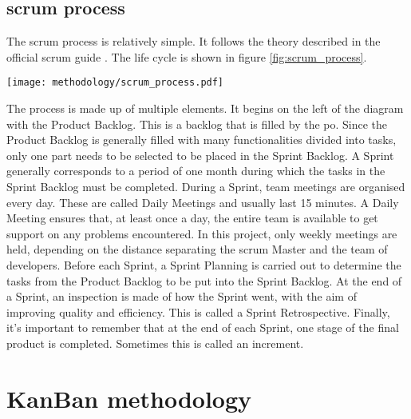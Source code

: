 \subsection{\texorpdfstring{\gls{scrum}}{} process}
The \gls{scrum} process is relatively simple. It follows the theory described in the official \gls{scrum} guide \cite{scrum_guide}. The life cycle is shown in figure \ref{fig:scrum_process}.
\begin{center}
    \begingroup
    \texttt{[image: methodology/scrum\_process.pdf]}
    \label{fig:scrum_process}
    \endgroup
\end{center}
The process is made up of multiple elements. It begins on the left of the diagram with the Product Backlog. This is a backlog that is filled by the \acrshort{po}. Since the Product Backlog is generally filled with many functionalities divided into tasks, only one part needs to be selected to be placed in the Sprint Backlog. A Sprint generally corresponds to a period of one month during which the tasks in the Sprint Backlog must be completed. During a Sprint, team meetings are organised every day. These are called Daily Meetings and usually last 15 minutes. A Daily Meeting ensures that, at least once a day, the entire team is available to get support on any problems encountered. In this project, only weekly meetings are held, depending on the distance separating the \gls{scrum} Master and the team of developers. Before each Sprint, a Sprint Planning is carried out to determine the tasks from the Product Backlog to be put into the Sprint Backlog. At the end of a Sprint, an inspection is made of how the Sprint went, with the aim of improving quality and efficiency. This is called a Sprint Retrospective. Finally, it's important to remember that at the end of each Sprint, one stage of the final product is completed. Sometimes this is called an increment.

\section{KanBan methodology}

